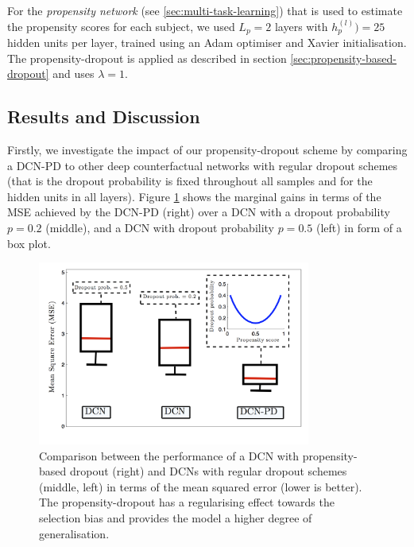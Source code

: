 For the \emph{propensity network} (see \ref{sec:multi-task-learning}) that is used to estimate the propensity scores for each subject, we used $L_p = 2$ layers with $h_p^{(l)}) = 25$ hidden units per layer, trained using an Adam optimiser %
and Xavier initialisation. %
The propensity-dropout is applied as described in section \ref{sec:propensity-based-dropout} and uses $\lambda = 1$. 

\subsection{Results and Discussion}
Firstly, we investigate the impact of our propensity-dropout scheme by comparing a DCN-PD to other deep counterfactual networks with regular dropout schemes (that is the dropout probability is fixed throughout all samples and for the hidden units in all layers). Figure \ref{fig:propensity-dropout-boxplot} shows the marginal gains in terms of the MSE achieved by the DCN-PD (right) over a DCN with a dropout probability $p=0.2$ (middle), and a DCN with dropout probability $p=0.5$ (left) in form of a box plot. 





\begin{figure}[h]
	\centering
	\includegraphics[width=0.8\textwidth]{figures/chapter-5/pd-boxplot.png}
	\caption{Comparison between the performance of a DCN with propensity-based dropout (right) and DCNs with regular dropout schemes (middle, left) in terms of the mean squared error (lower is better). The propensity-dropout has a regularising effect towards the selection bias and provides the model a higher degree of generalisation. }\label{fig:propensity-dropout-boxplot}
\end{figure}

